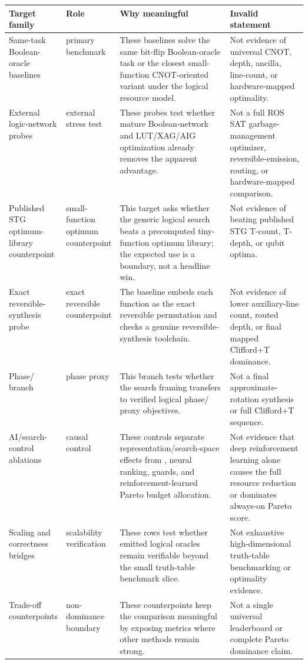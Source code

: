 \begin{tabularx}{\linewidth}{>{\raggedright\arraybackslash}p{0.18\linewidth}>{\raggedright\arraybackslash}p{0.15\linewidth}>{\raggedright\arraybackslash}X>{\raggedright\arraybackslash}p{0.26\linewidth}}
\toprule
Target family & Role & Why meaningful & Invalid statement \\
\midrule
Same-task Boolean-oracle baselines & primary benchmark & These baselines solve the same bit-flip Boolean-oracle task or the closest small-function CNOT-oriented variant under the logical resource model. & Not evidence of universal CNOT, depth, ancilla, line-count, or hardware-mapped optimality. \\
External logic-network probes & external stress test & These probes test whether mature Boolean-network and LUT/XAG/AIG optimization already removes the apparent advantage. & Not a full ROS SAT garbage-management optimizer, reversible-emission, routing, or hardware-mapped comparison. \\
Published STG optimum-library counterpoint & small-function optimum counterpoint & This target asks whether the generic logical search beats a precomputed tiny-function optimum library; the expected use is a boundary, not a headline win. & Not evidence of beating published STG T-count, T-depth, or qubit optima. \\
Exact reversible-synthesis probe & exact reversible counterpoint & The baseline embeds each function as the exact reversible permutation and checks a genuine reversible-synthesis toolchain. & Not evidence of lower auxiliary-line count, routed depth, or final mapped Clifford+T dominance. \\
Phase/\rz{} branch & phase proxy & This branch tests whether the search framing transfers to verified logical phase/\rz{} proxy objectives. & Not a final approximate-rotation synthesis or full Clifford+T sequence. \\
AI/search-control ablations & causal control & These controls separate representation/search-space effects from \mcts{}, neural ranking, guards, and reinforcement-learned Pareto budget allocation. & Not evidence that deep reinforcement learning alone causes the full resource reduction or dominates always-on Pareto score. \\
Scaling and correctness bridges & scalability verification & These rows test whether emitted logical oracles remain verifiable beyond the small truth-table benchmark slice. & Not exhaustive high-dimensional truth-table benchmarking or optimality evidence. \\
Trade-off counterpoints & non-dominance boundary & These counterpoints keep the comparison meaningful by exposing metrics where other methods remain strong. & Not a single universal leaderboard or complete Pareto dominance claim. \\
\bottomrule
\end{tabularx}
